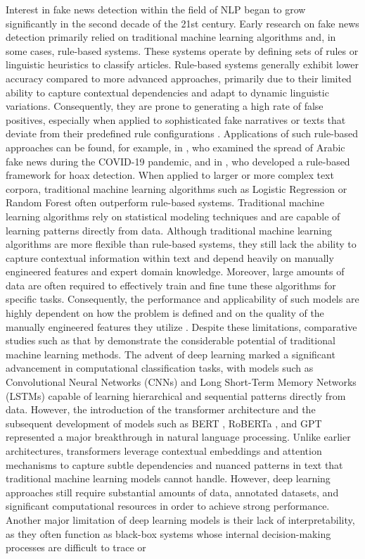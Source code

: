 \documentclass[12pt,a4paper,twocolumn]{article}
\begin{document}
Interest in fake news detection within the field of NLP began to grow significantly in the second decade of the 21st century. Early research on fake news detection primarily relied on traditional machine learning algorithms and, in some cases, rule-based systems. These systems operate by defining sets of rules or linguistic heuristics to classify articles. Rule-based systems generally exhibit lower accuracy compared to more advanced approaches, primarily due to their limited ability to capture contextual dependencies and adapt to dynamic linguistic variations. Consequently, they are prone to generating a high rate of false positives, especially when applied to sophisticated fake narratives or texts that deviate from their predefined rule configurations \citep{polu2024ai, repede2023comparison}. Applications of such rule-based approaches can be found, for example, in \citet{alotaibi2022rule}, who examined the spread of Arabic fake news during the COVID-19 pandemic, and in \citet{yuliani2019framework}, who developed a rule-based framework for hoax detection. When applied to larger or more complex text corpora, traditional machine learning algorithms such as Logistic Regression or Random Forest often outperform rule-based systems. Traditional machine learning algorithms rely on statistical modeling techniques and are capable of learning patterns directly from data. Although traditional machine learning algorithms are more flexible than rule-based systems, they still lack the ability to capture contextual information within text and depend heavily on manually engineered features and expert domain knowledge. Moreover, large amounts of data are often required to effectively train and fine tune these algorithms for specific tasks. Consequently, the performance and applicability of such models are highly dependent on how the problem is defined and on the quality of the manually engineered features they utilize \citep{polu2024ai, pittman2025truthtextmetaanalysismlbased}. Despite these limitations, comparative studies such as that by \citet{Sudhakar2022Prediction} demonstrate the considerable potential of traditional machine learning methods. The advent of deep learning marked a significant advancement in computational classification tasks, with models such as Convolutional Neural Networks (CNNs) and Long Short-Term Memory Networks (LSTMs) capable of learning hierarchical and sequential patterns directly from data. However, the introduction of the transformer architecture and the subsequent development of models such as BERT \citep{devlin-etal-2019-bert}, RoBERTa \citep{liu2019robertarobustlyoptimizedbert}, and GPT \citep{radford2018improving} represented a major breakthrough in natural language processing. Unlike earlier architectures, transformers leverage contextual embeddings and attention mechanisms to capture subtle dependencies and nuanced patterns in text that traditional machine learning models cannot handle. However, deep learning approaches still require substantial amounts of data, annotated datasets, and significant computational resources in order to achieve strong performance. Another major limitation of deep learning models is their lack of interpretability, as they often function as black-box systems whose internal decision-making processes are difficult to trace or 
\end{document}
